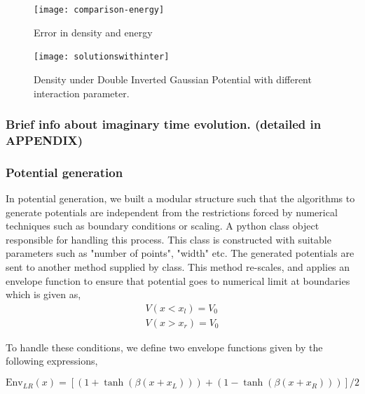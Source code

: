 \documentclass[a4paper,times,hidelinks,12pt]{article}
\begin{document}
\graphicspath{{"../figs/numericanalyze/"}}
\begin{figure}[H]
\centering
    \texttt{[image: comparison-energy]}
\caption{Error in density and energy}
\label{fig:dens_energy_error}
\end{figure}


\graphicspath{{"../figs/potentials/"}}
\begin{figure}[H]
    \texttt{[image: solutionswithinter]}
    \caption{Density under Double Inverted Gaussian Potential with different interaction parameter.}
\label{fig:gaussian_pot_and_density}
\end{figure}

\subsubsection{Brief info about imaginary time evolution. (detailed in APPENDIX)}
\subsubsection{Potential generation} \label{sec:potential_generation}

In potential generation, we built a modular structure such that the algorithms to generate potentials are independent from the restrictions forced by numerical techniques such as boundary conditions or scaling. A python class object responsible for handling this process. This class is constructed with suitable parameters such as "number of points", "width" etc. The generated potentials are sent to another method supplied by class. This method re-scales, and applies an envelope function to ensure that potential goes to numerical limit at boundaries which is given as,
\begin{equation}
\label{eq:potential_boundary_conditions}
\begin{split}
    V(x < x_l) = V_0 \\ 
    V(x > x_r) = V_0
\end{split}
\end{equation}

To handle these conditions, we define two envelope functions given by the following expressions, 

\begin{equation}
\label{eq:envelope_potential_lr}
    \text{Env}_{LR}(x) = [(1 + \tanh{(\beta(x + x_L))}) + (1 - \tanh{(\beta(x + x_R))})]/2
\end{equation}
\end{document}
